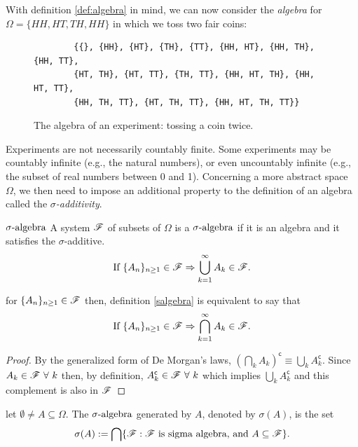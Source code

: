 \documentclass[../TGMAFFIRO.tex]{subfiles}
\begin{document}
With definition \ref{def:algebra} in mind, we can now consider the \textit{algebra} for $\Omega = \{HH, HT, TH, HH\}$ in which we toss two fair coins:

\begin{figure}[h]
	\centering
	
	\begin{verbatim}
		{{}, {HH}, {HT}, {TH}, {TT}, {HH, HT}, {HH, TH}, {HH, TT},
		{HT, TH}, {HT, TT}, {TH, TT}, {HH, HT, TH}, {HH, HT, TT},
		{HH, TH, TT}, {HT, TH, TT}, {HH, HT, TH, TT}}
	\end{verbatim}
  \caption{The algebra of an experiment: tossing a coin twice.}
\end{figure}

Experiments are not necessarily countably finite. Some experiments may be countably infinite (e.g., the natural numbers), or even uncountably infinite (e.g., the subset of real numbers between 0 and 1). Concerning a more abstract space $\Omega$, we then need to impose an additional property to the definition of an algebra called the \textit{$\sigma$-additivity}.

\begin{definition}{\textbf{$\sigma\text{-algebra}$}}\label{salgebra}
	A system $\mathscr{F}$ of subsets of $\Omega$ is a $\sigma\text{-algebra}$ if it is an algebra and it satisfies the $\sigma$-additive. 
	\begin{equation*}
		\text{If } \{A_n\}_{n\geq 1} \in \mathscr{F} \Rightarrow \bigcup_{k=1}^{\infty} A_k \in \mathscr{F}.
	\end{equation*}
\end{definition}

\begin{remark}
	for $\{A_n\}_{n\geq 1} \in \mathscr{F}$ then, definition \ref{salgebra} is equivalent to say that
	\begin{equation*}
		\text{If } \{A_n\}_{n\geq 1} \in \mathscr{F} \Rightarrow \bigcap_{k=1}^{\infty} A_k \in \mathscr{F}.
	\end{equation*}
\end{remark}

\begin{proof}
	By the generalized form of De Morgan's laws, $(\bigcap_k A_k)^\mathsf{c} \equiv \bigcup_k A_k^\mathsf{c}$. Since $A_k \in \mathscr{F} \ \forall \ k$ then, by definition,  $A_k^\mathsf{c} \in \mathscr{F} \ \forall \ k$ which implies  $\bigcup_k A_k^\mathsf{c}$ and this complement is also in $\mathscr{F}$
\end{proof}

\begin{definition}\label{generated_sigma_algebra}
	let $\emptyset \neq A \subseteq \Omega$. The $\sigma\text{-algebra}$ generated by $A$, denoted by $\sigma(A)$, is the set
	\begin{equation}
		\sigma(A) := \bigcap\{\mathscr{F} : \mathscr{F} \text{ is sigma algebra, and } A \subseteq \mathscr{F} \}.
	\end{equation}

\end{definition}
\end{document}
